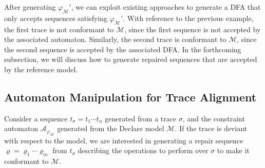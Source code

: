 After generating $\varphi_{\mathcal{M}}'$, we can exploit existing approaches \cite{Westergaard11} to generate a DFA that only accepts sequences satisfying $\varphi_{\mathcal{M}}'$. With reference to the previous example, the first trace is not conformant to $\mathcal{M}$, since the first sequence is not accepted by the associated automaton. Similarly, the second trace is conformant to $\mathcal{M}$, since the second sequence is accepted by the associated DFA. In the forthcoming subsection, we will discuss how to generate repaired sequences that are accepted by the reference model.

\subsection{Automaton Manipulation for Trace Alignment}\label{ssec:amfta}
Consider a sequence $t_\sigma=t_1\cdots t_n$ generated from a trace $\sigma$, and the constraint automaton $\mathcal{A}_{\varphi_{\mathcal{M}}}$ generated from the Declare model $\mathcal{M}$. If the trace is deviant with respect to the model, we are interested in generating a repair sequence $\varrho=\varrho_1\cdots \varrho_m$ from $t_\sigma$ describing the operations to perform over $\sigma$ to make it conformant to $\mathcal{M}$.

